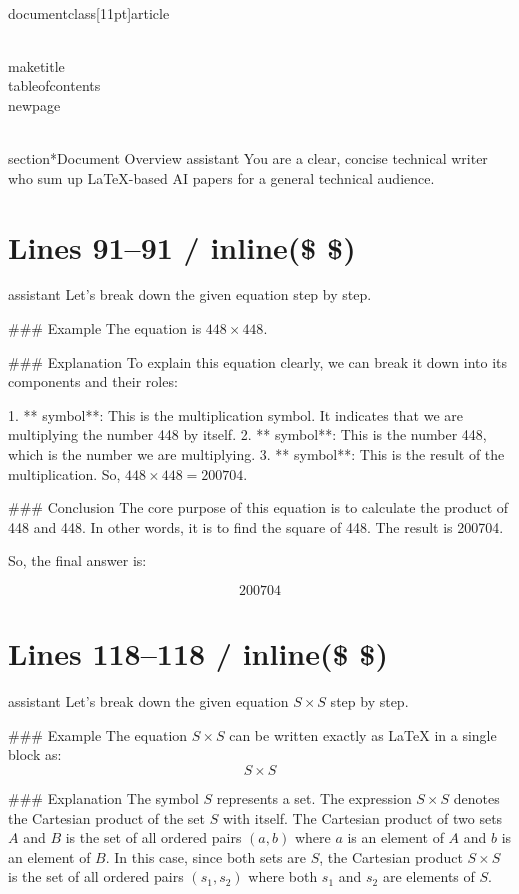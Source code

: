 \\documentclass[11pt]{article}
\begin{document}
\\maketitle
\\tableofcontents
\\newpage

\\section*{Document Overview}
assistant
You are a clear, concise technical writer who sum up LaTeX-based AI papers for a general technical audience.

\newpage

\section*{Lines 91–91 / inline(\$ \$) }
assistant
Let's break down the given equation step by step.

### Example
The equation is \(448 \times 448\).

### Explanation
To explain this equation clearly, we can break it down into its components and their roles:

1. ** symbol**: This is the multiplication symbol. It indicates that we are multiplying the number 448 by itself.
2. ** symbol**: This is the number 448, which is the number we are multiplying.
3. ** symbol**: This is the result of the multiplication. So, \(448 \times 448 = 200704\).

### Conclusion
The core purpose of this equation is to calculate the product of 448 and 448. In other words, it is to find the square of 448. The result is 200704.

So, the final answer is:

\[
\boxed{200704}
\]


\section*{Lines 118–118 / inline(\$ \$) }
assistant
Let's break down the given equation \( S \times S \) step by step.

### Example
The equation \( S \times S \) can be written exactly as LaTeX in a single block as:
\[ S \times S \]

### Explanation
The symbol \( S \) represents a set. The expression \( S \times S \) denotes the Cartesian product of the set \( S \) with itself. The Cartesian product of two sets \( A \) and \( B \) is the set of all ordered pairs \((a, b)\) where \( a \) is an element of \( A \) and \( b \) is an element of \( B \). In this case, since both sets are \( S \), the Cartesian product \( S \times S \) is the set of all ordered pairs \((s_1, s_2)\) where both \( s_1 \) and \( s_2 \) are elements of \( S \).
\end{document}
